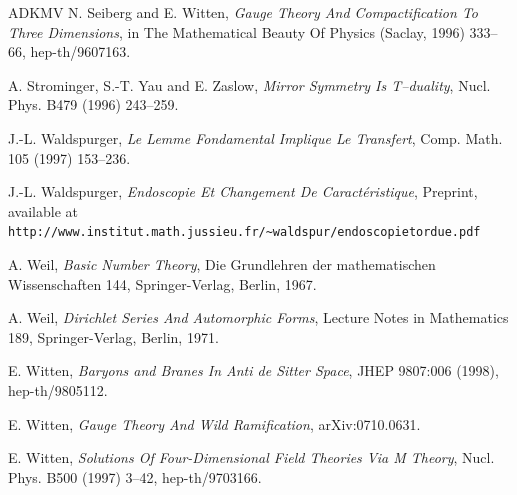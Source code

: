 \documentclass[11pt,a4paper]{article}
\begin{document}
\begin{thebibliography}{ADKMV}
 N. Seiberg and E. Witten, \emph{Gauge Theory And Compactification To Three Dimensions}, in The Mathematical Beauty Of Physics (Saclay, 1996) 333--66, hep-th/9607163.

 A. Strominger, S.-T. Yau and E. Zaslow, \emph{Mirror Symmetry Is T--duality}, Nucl. Phys. B479 (1996) 243--259.

 J.-L. Waldspurger, \emph{Le Lemme Fondamental Implique Le Transfert}, Comp. Math. 105 (1997) 153--236.

 J.-L. Waldspurger, \emph{Endoscopie Et Changement De Caract\'eristique}, Preprint, available at \texttt{http://www.institut.math.jussieu.fr/\textasciitilde waldspur/endoscopietordue.pdf}

 A. Weil, \emph{Basic Number Theory}, Die Grundlehren der mathematischen Wissenschaften 144, Springer-Verlag, Berlin, 1967.

 A. Weil, \emph{Dirichlet Series And Automorphic Forms}, Lecture Notes in Mathematics 189, Springer-Verlag, Berlin, 1971.

 E. Witten, \emph{Baryons and Branes In Anti de Sitter Space}, JHEP 9807:006 (1998), hep-th/9805112.

 E. Witten, \emph{Gauge Theory And Wild Ramification}, arXiv:0710.0631.

 E. Witten, \emph{Solutions Of Four-Dimensional Field Theories Via M Theory}, Nucl. Phys. B500 (1997) 3--42, hep-th/9703166.

\end{thebibliography}
\end{document}
